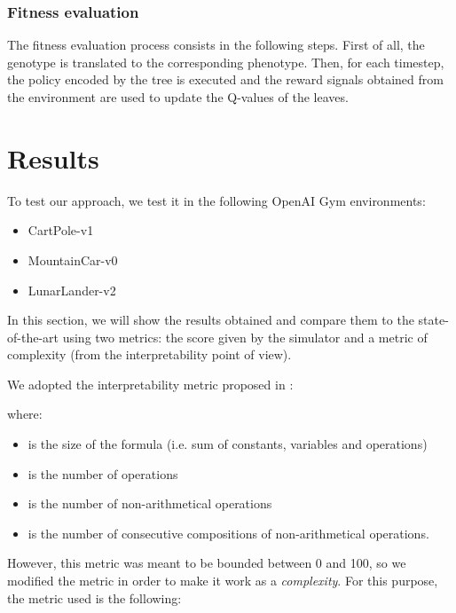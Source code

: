\documentclass[review,english]{elsarticle}
\begin{document}
\subsubsection{Fitness evaluation}
The fitness evaluation process consists in the following steps.
First of all, the genotype is translated to the corresponding phenotype.
Then, for each timestep, the policy encoded by the tree is executed and the reward signals obtained from the environment are used to update the Q-values of the leaves.

\section{Results}
\label{sec:results}
To test our approach, we test it in the following OpenAI Gym \cite{brockman2016openai} environments: 
\begin{itemize}
    \item CartPole-v1
    \item MountainCar-v0
    \item LunarLander-v2
\end{itemize}

In this section, we will show the results obtained and compare them to the state-of-the-art using two metrics: the score given by the simulator and a metric of complexity (from the interpretability point of view).

We adopted the interpretability metric proposed in \cite{virgolin_learning_2020}:

where:
\begin{itemize}
    \item  is the size of the formula (i.e. sum of constants, variables and operations)
    \item  is the number of operations
    \item  is the number of non-arithmetical operations
    \item  is the number of consecutive compositions of non-arithmetical operations.
\end{itemize}

However, this metric was meant to be bounded between 0 and 100, so we modified the metric in order to make it work as a \textit{complexity}.
For this purpose, the metric used is the following:
\end{document}
